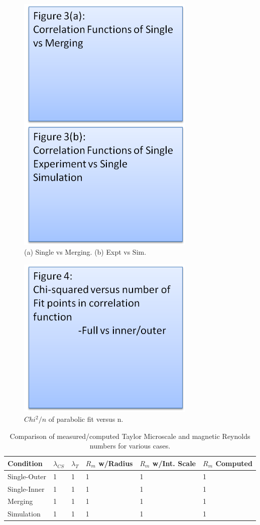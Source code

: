 \documentclass[aip,prl,amsmath,amssymb,reprint,superscriptaddress]{revtex4-1} %
\begin{document}
\begin{figure}[!htbp]
\centerline{
\includegraphics[width=8.5cm]{figure3_placeholder.png}}
\caption{\label{fig:figure3_placeholder} (a) Single vs Merging. (b) Expt vs Sim.}
\end{figure}

\begin{figure}[!htbp]
\centerline{
\includegraphics[width=8.5cm]{figure4_placeholder.png}}
\caption{\label{fig:figure4_placeholder} $Chi^{2}/n$ of parabolic fit versus n.}
\end{figure}

\begin{table}
\caption{\label{tab:Rms}Comparison of measured/computed Taylor Microscale and magnetic Reynolds numbers for various cases.}
\begin{tabular}{|l|l|l|l|l|l|}
\hline
Condition&$\lambda_{CS}$&$\lambda_{T}$&$R_{m}$ w/Radius&$R_{m}$ w/Int. Scale&$R_{m}$ Computed\\
\hline
Single-Outer&1&1&1&1&1\\
Single-Inner&1&1&1&1&1\\
Merging&1&1&1&1&1\\
Simulation&1&1&1&1&1\\
\hline
\end{tabular}
\end{table}
\end{document}
